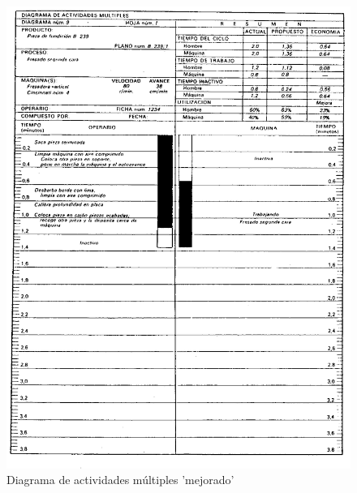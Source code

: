 \documentclass[a4paper,oneside,11pt]{article}
\begin{document}
\begin{figure} [ht!]
    \centering
    \includegraphics[scale=1.3]{actividades multiples mejorado.png}
    \caption{Diagrama de actividades múltiples 'mejorado'}
    \label{fig:mejorado}
\end{figure}
\end{document}

